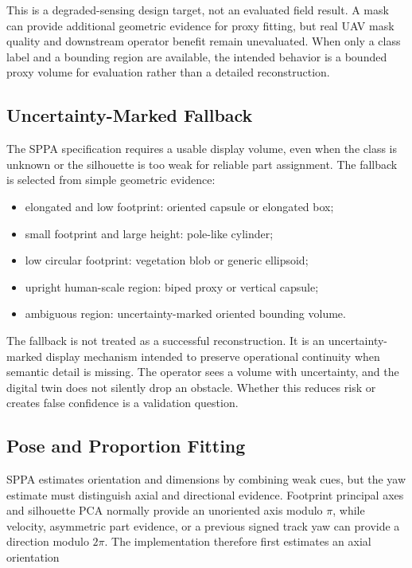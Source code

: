 ﻿\documentclass[11pt,a4paper]{article}
\begin{document}
This is a degraded-sensing design target, not an evaluated field result. A mask
can provide additional geometric evidence for proxy fitting, but real UAV mask
quality and downstream operator benefit remain unevaluated. When only a class
label and a bounding region are available, the intended behavior is a
bounded proxy volume for evaluation rather than a detailed reconstruction.

\subsection{Uncertainty-Marked Fallback}

The SPPA specification requires a usable display volume, even when the class is unknown or the
silhouette is too weak for reliable part assignment. The fallback is selected
from simple geometric evidence:

\begin{itemize}
    \item elongated and low footprint: oriented capsule or elongated box;
    \item small footprint and large height: pole-like cylinder;
    \item low circular footprint: vegetation blob or generic ellipsoid;
    \item upright human-scale region: biped proxy or vertical capsule;
    \item ambiguous region: uncertainty-marked oriented bounding volume.
\end{itemize}

The fallback is not treated as a successful reconstruction. It is an
uncertainty-marked display mechanism intended to preserve operational continuity when semantic
detail is missing. The operator sees a volume with uncertainty, and the digital
twin does not silently drop an obstacle. Whether this reduces risk or creates
false confidence is a validation question.

\subsection{Pose and Proportion Fitting}

SPPA estimates orientation and dimensions by combining weak cues, but the yaw
estimate must distinguish axial and directional evidence. Footprint principal
axes and silhouette PCA normally provide an unoriented axis modulo \(\pi\),
while velocity, asymmetric part evidence, or a previous signed track yaw can
provide a direction modulo \(2\pi\). The implementation therefore first estimates
an axial orientation
\end{document}
